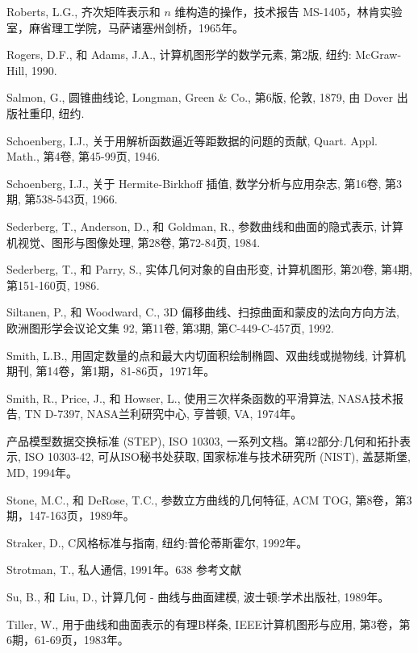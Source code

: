 \documentclass[../main.tex]{subfiles}
\begin{document}
\begin{BookBibliography}
 Roberts, L.G., 齐次矩阵表示和 \(n\) 维构造的操作，技术报告 MS-1405，林肯实验室，麻省理工学院，马萨诸塞州剑桥，1965年。

 Rogers, D.F., 和 Adams, J.A., 计算机图形学的数学元素, 第2版, 纽约: McGraw-Hill, 1990.

 Salmon, G., 圆锥曲线论, Longman, Green \& Co., 第6版, 伦敦, 1879, 由 Dover 出版社重印, 纽约.

 Schoenberg, I.J., 关于用解析函数逼近等距数据的问题的贡献, Quart. Appl. Math., 第4卷, 第45-99页, 1946.

 Schoenberg, I.J., 关于 Hermite-Birkhoff 插值, 数学分析与应用杂志, 第16卷, 第3期, 第538-543页, 1966.

 Sederberg, T., Anderson, D., 和 Goldman, R., 参数曲线和曲面的隐式表示, 计算机视觉、图形与图像处理, 第28卷, 第72-84页, 1984.

 Sederberg, T., 和 Parry, S., 实体几何对象的自由形变, 计算机图形, 第20卷, 第4期, 第151-160页, 1986.

 Siltanen, P., 和 Woodward, C., 3D 偏移曲线、扫掠曲面和蒙皮的法向方向方法, 欧洲图形学会议论文集 92, 第11卷, 第3期, 第C-449-C-457页, 1992.

 Smith, L.B., 用固定数量的点和最大内切面积绘制椭圆、双曲线或抛物线, 计算机期刊, 第14卷，第1期，81-86页，1971年。

 Smith, R., Price, J., 和 Howser, L., 使用三次样条函数的平滑算法, NASA技术报告, TN D-7397, NASA兰利研究中心, 亨普顿, VA, 1974年。

 产品模型数据交换标准 (STEP), ISO 10303, 一系列文档。第42部分:几何和拓扑表示, ISO 10303-42, 可从ISO秘书处获取, 国家标准与技术研究所 (NIST), 盖瑟斯堡, MD, 1994年。

 Stone, M.C., 和 DeRose, T.C., 参数立方曲线的几何特征, ACM TOG, 第8卷，第3期，147-163页，1989年。

 Straker, D., C风格标准与指南, 纽约:普伦蒂斯霍尔, 1992年。

 Strotman, T., 私人通信, 1991年。638 参考文献

 Su, B., 和 Liu, D., 计算几何 - 曲线与曲面建模, 波士顿:学术出版社, 1989年。

 Tiller, W., 用于曲线和曲面表示的有理B样条, IEEE计算机图形与应用, 第3卷，第6期，61-69页，1983年。


\end{BookBibliography}
\end{document}
